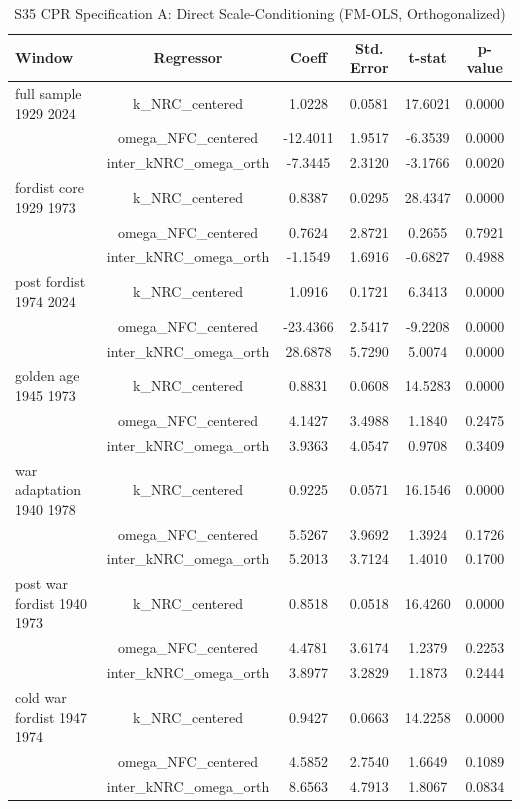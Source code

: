 \begin{table}[htbp]
\centering
\caption{S35 CPR Specification A: Direct Scale-Conditioning (FM-OLS, Orthogonalized)}
\label{tab:cpr_scale_conditioning}
\begin{tabular}{lccccc}
\hline
Window & Regressor & Coeff & Std. Error & t-stat & p-value \\
\hline
full sample 1929 2024 & k\_NRC\_centered & 1.0228 & 0.0581 & 17.6021 & 0.0000 \\
 & omega\_NFC\_centered & -12.4011 & 1.9517 & -6.3539 & 0.0000 \\
 & inter\_kNRC\_omega\_orth & -7.3445 & 2.3120 & -3.1766 & 0.0020 \\
\hline
fordist core 1929 1973 & k\_NRC\_centered & 0.8387 & 0.0295 & 28.4347 & 0.0000 \\
 & omega\_NFC\_centered & 0.7624 & 2.8721 & 0.2655 & 0.7921 \\
 & inter\_kNRC\_omega\_orth & -1.1549 & 1.6916 & -0.6827 & 0.4988 \\
\hline
post fordist 1974 2024 & k\_NRC\_centered & 1.0916 & 0.1721 & 6.3413 & 0.0000 \\
 & omega\_NFC\_centered & -23.4366 & 2.5417 & -9.2208 & 0.0000 \\
 & inter\_kNRC\_omega\_orth & 28.6878 & 5.7290 & 5.0074 & 0.0000 \\
\hline
golden age 1945 1973 & k\_NRC\_centered & 0.8831 & 0.0608 & 14.5283 & 0.0000 \\
 & omega\_NFC\_centered & 4.1427 & 3.4988 & 1.1840 & 0.2475 \\
 & inter\_kNRC\_omega\_orth & 3.9363 & 4.0547 & 0.9708 & 0.3409 \\
\hline
war adaptation 1940 1978 & k\_NRC\_centered & 0.9225 & 0.0571 & 16.1546 & 0.0000 \\
 & omega\_NFC\_centered & 5.5267 & 3.9692 & 1.3924 & 0.1726 \\
 & inter\_kNRC\_omega\_orth & 5.2013 & 3.7124 & 1.4010 & 0.1700 \\
\hline
post war fordist 1940 1973 & k\_NRC\_centered & 0.8518 & 0.0518 & 16.4260 & 0.0000 \\
 & omega\_NFC\_centered & 4.4781 & 3.6174 & 1.2379 & 0.2253 \\
 & inter\_kNRC\_omega\_orth & 3.8977 & 3.2829 & 1.1873 & 0.2444 \\
\hline
cold war fordist 1947 1974 & k\_NRC\_centered & 0.9427 & 0.0663 & 14.2258 & 0.0000 \\
 & omega\_NFC\_centered & 4.5852 & 2.7540 & 1.6649 & 0.1089 \\
 & inter\_kNRC\_omega\_orth & 8.6563 & 4.7913 & 1.8067 & 0.0834 \\
\hline
\end{tabular}
\end{table}
